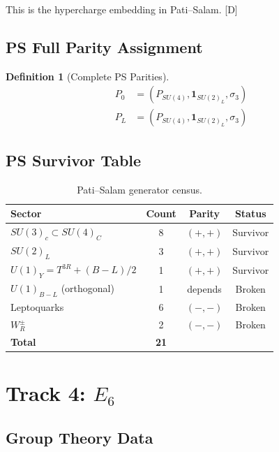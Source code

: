 \documentclass[11pt,a4paper]{article}
\newtheorem{definition}[theorem]{Definition}
\newcommand{\tagD}{\textcolor{blue!70!black}{[D]}}
\begin{document}
This is the hypercharge embedding in Pati--Salam. \tagD

\subsection{PS Full Parity Assignment}

\begin{definition}[Complete PS Parities]
\label{def:ps-full}
\begin{align}
\label{eq:ps-P0-full}
P_0 &= (P_{SU(4)}, \mathbf{1}_{SU(2)_L}, \sigma_3) \\
\label{eq:ps-PL-full}
P_L &= (P_{SU(4)}, \mathbf{1}_{SU(2)_L}, \sigma_3)
\end{align}
\end{definition}

\subsection{PS Survivor Table}

\begin{table}[h]
\centering
\begin{tabular}{lccc}
\toprule
Sector & Count & Parity & Status \\
\midrule
$SU(3)_c \subset SU(4)_C$ & 8 & $(+,+)$ & Survivor \\
$SU(2)_L$ & 3 & $(+,+)$ & Survivor \\
$U(1)_Y = T^{3R} + (B-L)/2$ & 1 & $(+,+)$ & Survivor \\
$U(1)_{B-L}$ (orthogonal) & 1 & depends & Broken \\
Leptoquarks & 6 & $(-,-)$ & Broken \\
$W_R^\pm$ & 2 & $(-,-)$ & Broken \\
\midrule
\textbf{Total} & \textbf{21} & & \\
\bottomrule
\end{tabular}
\caption{Pati--Salam generator census.}
\label{tab:ps}
\end{table}

\section{Track 4: $E_6$}

\subsection{Group Theory Data}
\end{document}
